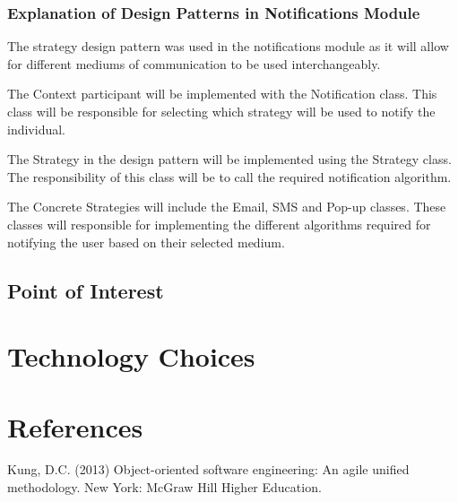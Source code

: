 \documentclass[runningheads,a4paper]{article}
\begin{document}
\subsubsection{Explanation of Design Patterns in Notifications Module}
The strategy design pattern was used in the notifications module as it will allow for different mediums of communication to be used interchangeably.

The Context participant will be implemented with the Notification class. This class will be responsible for selecting which strategy will be used to notify the individual.

The Strategy in the design pattern will be implemented using the Strategy class. The responsibility of this class will be to call the required notification algorithm.

The Concrete Strategies will include the Email, SMS and Pop-up classes. These classes will responsible for implementing the different algorithms required for notifying the user based on their selected medium.


\subsection {Point of Interest}



\section{Technology Choices}



\section{References}

Kung, D.C. (2013) Object-oriented software engineering: An agile unified methodology. New York: McGraw Hill Higher Education.
\end{document}
